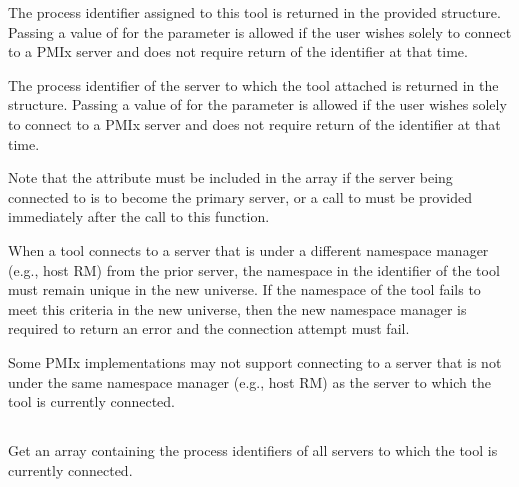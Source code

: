 {The process identifier assigned to this tool is returned in the provided  structure. Passing a value of  for the  parameter is allowed if the user wishes solely to connect to a \ac{PMIx} server and does not require return of the identifier at that time.

The process identifier of the server to which the tool attached is returned in the  structure. Passing a value of  for the  parameter is allowed if the user wishes solely to connect to a \ac{PMIx} server and does not require return of the identifier at that time.

Note that the  attribute must be included in the
 array if the server being connected to is to become the primary
server, or a call to  must be provided immediately
after the call to this function.

\adviceimplstart
When a tool connects to a server that is under a different namespace manager (e.g., host \ac{RM}) from the prior server, the namespace in the identifier of the tool must remain unique in the new universe. If the namespace of the tool fails to meet this criteria in the new universe, then the new namespace manager is required to return an error and the connection attempt must fail.
\adviceimplend

\adviceuserstart
Some \ac{PMIx} implementations may not support connecting to a server that is not under the same namespace manager (e.g., host \ac{RM}) as the server to which the tool is currently connected.
\adviceuserend


\subsection{}

\summary

Get an array containing the  process identifiers of all servers to which the tool is currently connected.

\format


\begin{arglist}
\end{arglist}

}

